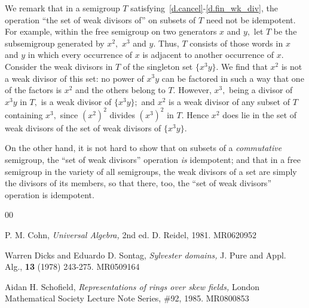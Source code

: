 \documentclass{amsart}
\numberwithin{equation}{section}
\numberwithin{theorem}{section}
\newcommand{\2}{\mathbf{2}}
\begin{document}
We remark that in a semigroup $T$
satisfying~\eqref{d.cancel}-\eqref{d.fin_wk_div},
the operation ``the set of weak divisors of'' on
subsets of $T$ need not be idempotent.
For example, within the free semigroup on two generators
$x$ and $y,$ let $T$ be the subsemigroup
generated by $x^2,$ $x^3$ and $y.$
Thus, $T$ consists of those words in $x$ and $y$ in
which every occurrence of $x$ is adjacent to another
occurrence of $x.$
Consider the weak divisors in $T$ of the singleton set $\{x^3 y\}.$
We find that $x^2$ is not a weak divisor of this set:
no power of $x^3 y$ can be factored in such a way that
one of the factors is $x^2$ and the others belong to $T.$
However, $x^3,$ being a divisor of $x^3 y$ in $T,$
is a weak divisor of $\{x^3 y\};$ and
$x^2$ is a weak divisor of any subset of $T$
containing $x^3,$ since $(x^2)^2$ divides $(x^3)^2$ in $T.$
Hence $x^2$ does lie in the set of weak divisors of the
set of weak divisors of $\{x^3 y\}.$

On the other hand, it is not hard to show that on subsets
of a {\em commutative} semigroup, the ``set of weak divisors''
operation {\em is} idempotent; and that in a free semigroup
in the variety of all semigroups,
the weak divisors of a set are simply the divisors
of its members, so that there, too, the
``set of weak divisors'' operation is idempotent.

\begin{thebibliography}{00}

 P. M. Cohn,
{\em Universal Algebra,} 2nd ed. D. Reidel, 1981.
MR0620952

 Warren Dicks and Eduardo D. Sontag,
{\em Sylvester domains,}
J. Pure and Appl. Alg., {\bf 13} (1978) 243-275. %
MR0509164

 Aidan H. Schofield,
{\em Representations of rings over skew fields,}
London Mathematical Society Lecture Note Series, \#92, 1985.
MR0800853

\end{thebibliography}
\end{document}
